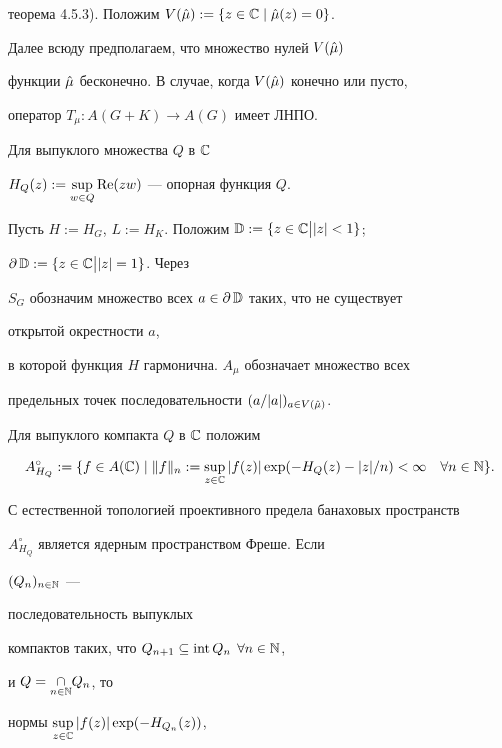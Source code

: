 теорема 4.5.3). Положим $V(\Hat\mu):=\{z\in\Bbb C\mid\Hat\mu(z)=0\}$. 


 


\begin{note} Далее всюду предполагаем, что множество нулей $V(\Hat\mu)$ 


функции $\Hat\mu$ бесконечно. В случае, когда $V(\Hat\mu)$ конечно или пусто, 


оператор $T_\mu :A(G+K)\to A(G)$ имеет ЛНПО. 


\end{note} 


 


Для выпуклого множества $Q$ в $\Bbb C$ 


$H_Q(z):=\sup\limits_{w\in Q}\operatorname{Re}(zw)$ --- опорная функция $Q$. 


Пусть $H:=H_G$, $L:=H_K$. Положим $\Bbb D:=\{z\in \Bbb C\bigl |\bigr.|z|<1\}$; 


$\partial\,\Bbb D:=\{z\in \Bbb C\bigl |\bigr.|z|=1\}$. Через 


$S_G$ обозначим множество всех $a\in\partial\,\Bbb D$ таких, что не существует 


открытой окрестности $a$, 


в которой функция $H$ гармонична. $A_\mu$ обозначает множество всех 


предельных точек последовательности $(a/|a|)_{a\in V(\Hat\mu)}$. 


 


Для выпуклого компакта $Q$ в $\Bbb C$ положим 


$$ 


A^\circ_{H_Q}:=\{f\in A(\Bbb C)\mid \|f\|_n:=\sup\limits_{z\in\Bbb C} 


|f(z)|\exp(-H_Q(z)-|z|/n)<\infty\quad\forall n\in \Bbb N\}. 


$$ 


С естественной топологией проективного предела банаховых пространств 


$A^\circ_{H_Q}$ является ядерным пространством Фреше. Если 


$(Q_n)_{n\in\Bbb N}$ ---


последовательность выпуклых 


компактов таких, что $Q_{n+1}\subseteq\operatorname{int} Q_n$ $\forall n\in\Bbb N$, 


и $Q=\underset{n\in\Bbb N}{\cap}Q_n$, то 


нормы $\sup\limits_{z\in\Bbb C}|f(z)|\exp(-H_{Q_n}(z))$, 


